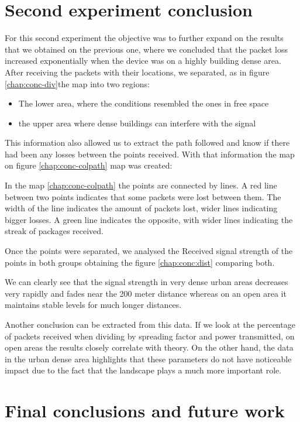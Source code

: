 \section{Second experiment conclusion}
For this second experiment the objective was to further expand on the results that we obtained on the previous one, where we concluded that the packet loss increased exponentially when the device was on a highly building dense area.
After receiving the packets with their locations, we separated, as in figure \vref{chap:conc-div}the map into two regions:
\begin{itemize}
    \item  The lower area, where the conditions resembled the ones in free space
    \item  the upper area where dense buildings can interfere with the signal
\end{itemize}



This information also allowed us to extract the path followed and know if there had been any losses between the points received.
With that information the map on figure \vref{chap:conc-colpath} map was created:


In the map \vref{chap:conc-colpath} the points are connected by lines. A red line between two points indicates that some packets were lost between them. The width of the line indicates the amount of packets lost,  wider lines indicating  bigger losses. 
A green line indicates the opposite, with wider lines indicating the streak of packages received.

Once the points were separated, we analysed the Received signal strength of the points in both 
groups obtaining the figure \vref{chap:conc:dist}  comparing both.

We can clearly see that the signal strength in very dense urban areas decreases very rapidly and fades near the 200 meter distance whereas 
on an open area it maintains stable levels for much longer distances.


Another conclusion can be extracted from this data. If we look at the percentage of packets received when dividing by spreading factor and power
transmitted, on open areas the results closely correlate with theory. On the other hand, the data in the urban dense area highlights that 
these parameters do not have noticeable impact due to the fact that the landscape plays a much more important role.
\\


\section{Final conclusions and future work}

